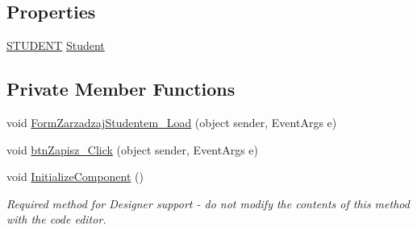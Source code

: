 \subsection*{Properties}
\begin{DoxyCompactItemize}
\item 
\hyperlink{class_dziennik_ocen_1_1_s_t_u_d_e_n_t}{S\+T\+U\+D\+E\+NT} \hyperlink{class_dziennik_ocen_1_1_form_zarzadzaj_studentem_a6725e64848d2a943830083be3849c3e5}{Student}
\end{DoxyCompactItemize}
\subsection*{Private Member Functions}
\begin{DoxyCompactItemize}
\item 
void \hyperlink{class_dziennik_ocen_1_1_form_zarzadzaj_studentem_afbd85dca33ecb88bc7498002ccaed41e}{Form\+Zarzadzaj\+Studentem\+\_\+\+Load} (object sender, Event\+Args e)
\item 
void \hyperlink{class_dziennik_ocen_1_1_form_zarzadzaj_studentem_a7aaf60fcd65bc83c851ddac85076a5dd}{btn\+Zapisz\+\_\+\+Click} (object sender, Event\+Args e)
\item 
void \hyperlink{class_dziennik_ocen_1_1_form_zarzadzaj_studentem_a9236e2f084822188d36dac89e165ff5b}{Initialize\+Component} ()
\begin{DoxyCompactList}\small\item\em Required method for Designer support -\/ do not modify the contents of this method with the code editor. \end{DoxyCompactList}\end{DoxyCompactItemize}
